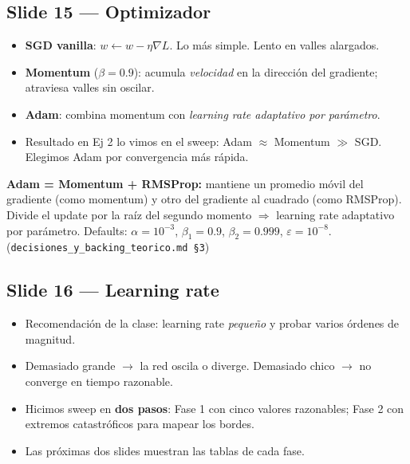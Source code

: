 \documentclass[11pt,a4paper]{article}
\newcommand{\nref}[1]{\textcolor{muted}{\small(\texttt{#1})}}
\begin{document}
\subsection{Slide 15 — Optimizador}

\begin{decir}
\begin{itemize}[leftmargin=*,topsep=0pt]
  \item \textbf{SGD vanilla}: $w \leftarrow w - \eta \nabla L$. Lo más simple. Lento
        en valles alargados.
  \item \textbf{Momentum} ($\beta = 0.9$): acumula \emph{velocidad} en la dirección
        del gradiente; atraviesa valles sin oscilar.
  \item \textbf{Adam}: combina momentum con \emph{learning rate adaptativo por
        parámetro}.
  \item Resultado en Ej 2 lo vimos en el sweep: Adam $\approx$ Momentum $\gg$ SGD.
        Elegimos Adam por convergencia más rápida.
\end{itemize}
\end{decir}

\begin{nota}
\textbf{Adam = Momentum + RMSProp:} mantiene un promedio móvil del gradiente
(como momentum) y otro del gradiente al cuadrado (como RMSProp). Divide el
update por la raíz del segundo momento $\Rightarrow$ learning rate adaptativo
por parámetro. Defaults: $\alpha = 10^{-3}$, $\beta_1 = 0.9$, $\beta_2 = 0.999$,
$\varepsilon = 10^{-8}$. \nref{decisiones\_y\_backing\_teorico.md \S 3}
\end{nota}

\subsection{Slide 16 — Learning rate}

\begin{decir}
\begin{itemize}[leftmargin=*,topsep=0pt]
  \item Recomendación de la clase: learning rate \emph{pequeño} y probar varios
        órdenes de magnitud.
  \item Demasiado grande $\to$ la red oscila o diverge. Demasiado chico $\to$
        no converge en tiempo razonable.
  \item Hicimos sweep en \textbf{dos pasos}: Fase 1 con cinco valores razonables;
        Fase 2 con extremos catastróficos para mapear los bordes.
  \item Las próximas dos slides muestran las tablas de cada fase.
\end{itemize}
\end{decir}
\end{document}
